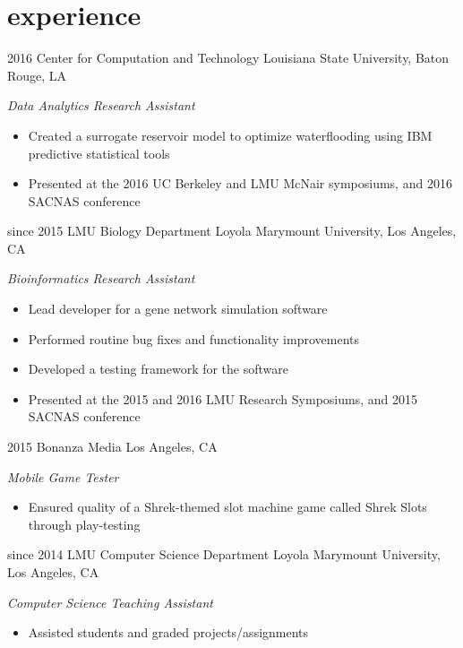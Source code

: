 \documentclass[]{friggeri-cv} %
\begin{document}
\section{experience}

  \begin{entrylist}


    \entry
      {2016}
      {Center for Computation and Technology}
      {Louisiana State University, Baton Rouge, LA}
      {\emph{Data Analytics Research Assistant}

        \begin{itemize}
	  \item Created a surrogate reservoir model to optimize waterflooding using IBM predictive statistical tools
	  \item Presented at the 2016 UC Berkeley and LMU McNair symposiums, and 2016 SACNAS conference
	\end{itemize}}


    \entry
      {since 2015}
      {LMU Biology Department}
      {Loyola Marymount University, Los Angeles, CA}
      {\emph{Bioinformatics Research Assistant}
      \begin{itemize}
	\item Lead developer for a gene network simulation software
	\item Performed routine bug fixes and functionality improvements
	\item Developed a testing framework for the software
	\item Presented at the 2015 and 2016 LMU Research Symposiums, and 2015 SACNAS conference
      \end{itemize}}
      

    \entry
      {2015}
      {Bonanza Media}
      {Los Angeles, CA}
      {\emph{Mobile Game Tester}
      \begin{itemize}
	\item Ensured quality of a Shrek-themed slot machine game called Shrek Slots through play-testing
      \end{itemize}}


    \entry
      {since 2014}
      {LMU Computer Science Department}
      {Loyola Marymount University, Los Angeles, CA}
      {\emph{Computer Science Teaching Assistant}
      \begin{itemize}
	\item Assisted students and graded projects/assignments
      \end{itemize}}


\end{entrylist}
\end{document}
